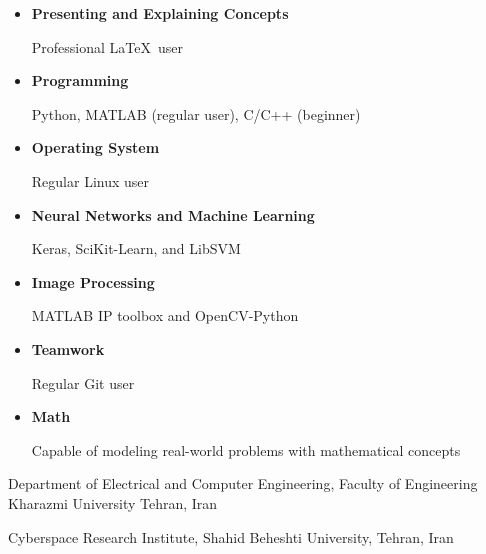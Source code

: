 
\begin{itemize}
	\item \textbf{Presenting and Explaining Concepts}

		Professional \LaTeX~user
	\item \textbf{Programming}

		Python, MATLAB (regular user), C/C++ (beginner)

	\item{\textbf{Operating System}}

		Regular Linux user


	\item \textbf{Neural Networks and Machine Learning}

		Keras, SciKit-Learn,  and LibSVM

	\item \textbf{Image Processing}

		MATLAB IP toolbox and OpenCV-Python

	\item \textbf{Teamwork}

		Regular Git user

	\item \textbf{Math}

		Capable of modeling real-world problems with mathematical concepts
\end{itemize}



{}



{Department of Electrical and Computer
Engineering,
Faculty of Engineering
Kharazmi University
Tehran, Iran}

\divider

{Cyberspace Research Institute, Shahid Beheshti University, Tehran, Iran}




